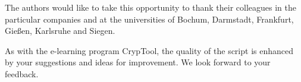 The authors would like to take this opportunity to thank their colleagues 
in the particular companies and at the universities of Bochum, Darmstadt,
Frankfurt, Gie\ss en, Karlsruhe and Siegen.

\enlargethispage{12pt}
As with the e-learning program CrypTool, the quality of the 
script is enhanced by your suggestions and ideas for improvement. 
We look forward to your feedback.


